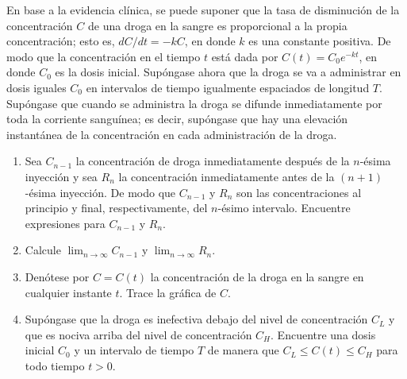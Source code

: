 \item En base a la evidencia clínica, se puede suponer que la tasa de disminución de la concentración $C$ de una droga en la sangre es proporcional a la propia concentración; esto es, $dC/dt = -kC$, en donde $k$ es una constante positiva. De modo que la concentración en el tiempo $t$ está dada por $C(t) = C_0 e^{-kt}$, en donde $C_0$ es la dosis inicial. Supóngase ahora que la droga se va a administrar en dosis iguales $C_0$ en intervalos de tiempo igualmente espaciados de longitud $T$. Supóngase que cuando se administra la droga se difunde inmediatamente por toda la corriente sanguínea; es decir, supóngase que hay una elevación instantánea de la concentración en cada administración de la droga.
    \begin{enumerate}
        \item Sea $C_{n-1}$ la concentración de droga inmediatamente después de la $n$-ésima inyección y sea $R_n$ la concentración inmediatamente antes de la $(n + 1)$-ésima inyección. De modo que $C_{n-1}$ y $R_n$ son las concentraciones al principio y final, respectivamente, del $n$-ésimo intervalo. Encuentre expresiones para $C_{n-1}$ y $R_n$.
        \item Calcule $\lim_{n \to \infty} C_{n-1}$ y $\lim_{n \to \infty} R_n$.
        \item Denótese por $C = C(t)$ la concentración de la droga en la sangre en cualquier instante $t$. Trace la gráfica de $C$.
        \item Supóngase que la droga es inefectiva debajo del nivel de concentración $C_L$ y que es nociva arriba del nivel de concentración $C_H$. Encuentre una dosis inicial $C_0$ y un intervalo de tiempo $T$ de manera que $C_L \le C(t) \le C_H$ para todo tiempo $t > 0$.
    \end{enumerate}
